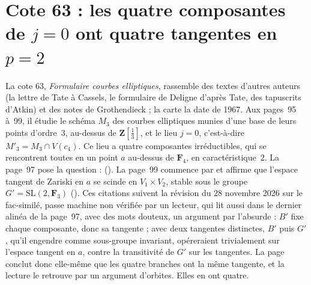 \section[Cote 63 : les quatre composantes de $j = 0$ ont quatre tangentes en $p = 2$]{Cote 63 : les quatre composantes de $j = 0$ ont quatre tangentes en $p = 2$\protect{}}\label{sec:63}

La cote 63, \emph{Formulaire courbes elliptiques}, rassemble des textes d'autres auteurs (la lettre de Tate à Cassels, le formulaire de Deligne d'après Tate, des tapuscrits d'Atkin) et des notes de Grothendieck ; la carte la date de 1967. Aux pages~95 à~99, il étudie le schéma $M_3$ des courbes elliptiques munies d'une base de leurs points d'ordre~$3$, au-dessus de $\mathbf Z[\frac13]$, et le lieu $j = 0$, c'est-à-dire $M'_3 = M_3 \cap V(c_4)$. Ce lieu a quatre composantes irréductibles, qui se rencontrent toutes en un point $a$ au-dessus de $\mathbf F_4$, en caractéristique~$2$. La page~97 pose la question :  (). La page~99 commence par  et affirme que l'espace tangent de Zariski en $a$ se scinde en $V_1 \times V_2$, stable sous le groupe $G' = \mathrm{SL}(2, \mathbf F_3)$ (). Ces citations suivent la révision du 28 novembre 2026 sur le fac-similé, passe machine non vérifiée par un lecteur, qui lit aussi dans le dernier alinéa de la page~97, avec des mots douteux, un argument par l'absurde : $B'$ fixe chaque composante, donc sa tangente ; avec deux tangentes distinctes, $B'$ puis $G'$, qu'il engendre comme sous-groupe invariant, opéreraient trivialement sur l'espace tangent en $a$, contre la transitivité de $G'$ sur les tangentes. La page conclut donc elle-même que les quatre branches ont la même tangente, et la lecture le retrouve par un argument d'orbites. Elles en ont quatre.

